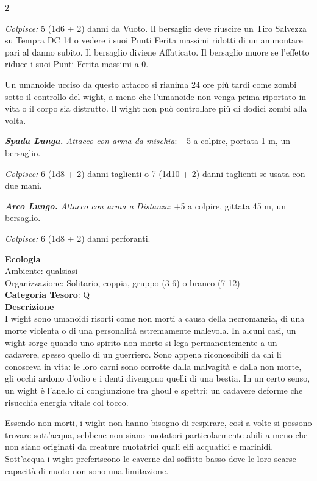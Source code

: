 \begin{multicols}{2}
{\emph{Colpisce:} 5 (1d6 + 2) danni da Vuoto. Il bersaglio deve riuscire un Tiro Salvezza su Tempra DC 14 o vedere i suoi Punti Ferita massimi ridotti di un ammontare pari al danno subito. Il bersaglio diviene Affaticato. Il bersaglio muore se l'effetto riduce i suoi Punti Ferita massimi a 0.

Un umanoide ucciso da questo attacco si rianima 24 ore più tardi come zombi sotto il controllo del wight, a meno che l'umanoide non venga prima riportato in vita o il corpo sia distrutto. Il wight non può controllare più di dodici zombi alla volta.

\emph{\textbf{Spada Lunga.} Attacco con arma da mischia}: +5 a colpire, portata 1 m, un bersaglio.

\emph{Colpisce:} 6 (1d8 + 2) danni taglienti o 7 (1d10 + 2) danni taglienti se usata con due mani.

\emph{\textbf{Arco Lungo.} Attacco con arma a Distanza}: +5 a colpire, gittata 45 m, un bersaglio.

\emph{Colpisce:} 6 (1d8 + 2) danni perforanti.

\textbf{Ecologia}\\
Ambiente: qualsiasi\\
Organizzazione: Solitario, coppia, gruppo (3-6) o branco (7-12)\\
\textbf{Categoria Tesoro}: Q\\
\textbf{Descrizione}\\
I wight sono umanoidi risorti come non morti a causa della necromanzia, di una morte violenta o di una personalità estremamente malevola. In alcuni casi, un wight sorge quando uno spirito non morto si lega permanentemente a un cadavere, spesso quello di un guerriero. Sono appena riconoscibili da chi li conosceva in vita: le loro carni sono corrotte dalla malvagità e dalla non morte, gli occhi ardono d'odio e i denti divengono quelli di una bestia. In un certo senso, un wight è l'anello di congiunzione tra ghoul e spettri: un cadavere deforme che risucchia energia vitale col tocco.

Essendo non morti, i wight non hanno bisogno di respirare, così a volte si possono trovare sott'acqua, sebbene non siano nuotatori particolarmente abili a meno che non siano originati da creature nuotatrici quali elfi acquatici e marinidi. Sott'acqua i wight preferiscono le caverne dal soffitto basso dove le loro scarse capacità di nuoto non sono una limitazione.

}
\end{multicols}
